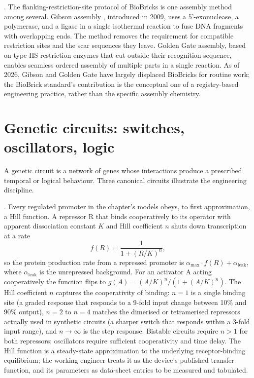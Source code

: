 . The
flanking-restriction-site protocol of BioBricks is one assembly
method among several. Gibson assembly
\cite[pp.~343--345]{paper:v6c09-gibson-assembly-2009}, introduced in 2009,
uses a 5'-exonuclease, a polymerase, and a ligase in a single
isothermal reaction to fuse DNA fragments with overlapping ends. The
method removes the requirement for compatible restriction sites and
the scar sequences they leave. Golden Gate assembly, based on
type-IIS restriction enzymes that cut outside their recognition
sequence, enables seamless ordered assembly of multiple parts in a
single reaction. As of 2026, Gibson and Golden Gate have largely
displaced BioBricks for routine work; the BioBrick standard's
contribution is the conceptual one of a registry-based engineering
practice, rather than the specific assembly chemistry.

\section{Genetic circuits: switches, oscillators, logic}

A genetic circuit is a network of genes whose interactions produce
a prescribed temporal or logical behaviour. Three canonical circuits
illustrate the engineering discipline.


.
Every regulated promoter in the chapter's models obeys, to first
approximation, a Hill function. A repressor R that binds
cooperatively to its operator with apparent dissociation constant
$K$ and Hill coefficient $n$ shuts down transcription at a rate
\[
f(R) = \frac{1}{1 + (R/K)^{n}},
\]
so the protein production rate from a repressed promoter is
$\alpha_{\max} \cdot f(R) + \alpha_{\text{leak}}$, where
$\alpha_{\text{leak}}$ is the unrepressed background. For an
activator A acting cooperatively the function flips to
$g(A) = (A/K)^{n}/(1 + (A/K)^{n})$. The Hill coefficient $n$
captures the cooperativity of binding: $n = 1$ is a single binding
site (a graded response that responds to a 9-fold input change
between 10\% and 90\% output), $n = 2$ to $n = 4$ matches the
dimerised or tetramerised repressors actually used in synthetic
circuits (a sharper switch that responds within a 3-fold input
range), and $n \to \infty$ is the step response. Bistable circuits
require $n > 1$ for both repressors; oscillators require sufficient
cooperativity and time delay. The Hill function is a steady-state
approximation to the underlying receptor-binding equilibrium; the
working engineer treats it as the device's published transfer
function, and its parameters as data-sheet entries to be measured
and tabulated.

